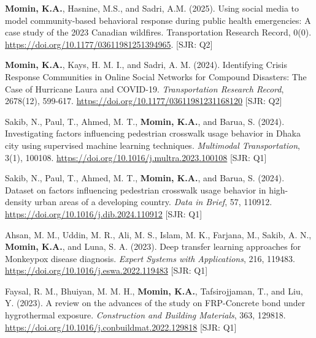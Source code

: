 \documentclass[a4paper,11pt]{article}
\begin{document}
\begin{enumerate}[leftmargin=*, labelsep=0em, align=left, widest={[\textbf{J.10}]}, itemindent=0em, label={\textbf{[J.\arabic*]}}]
\begin{justifying}
    \item \textbf{Momin, K.A.}, Hasnine, M.S., and Sadri, A.M. (2025). Using social media to model community-based behavioral response during public health emergencies: A case study of the 2023 Canadian wildfires. Transportation Research Record, 0(0). \href{https://doi.org/10.1177/03611981251394965}{https://doi.org/10.1177/03611981251394965}. \hfill [\textcolor{mycolor}{SJR: Q2}]

    \item \textbf{Momin, K.A.}, Kays, H. M. I., and Sadri, A. M. (2024). Identifying Crisis Response Communities in Online Social Networks for Compound Disasters: The Case of Hurricane Laura and COVID-19. \textit{Transportation Research Record}, 2678(12), 599-617. \href{https://doi.org/10.1177/03611981231168120}{https://doi.org/10.1177/03611981231168120}     \hfill [\textcolor{mycolor}{SJR: Q2}]
    
    \item Sakib, N., Paul, T., Ahmed, M. T., \textbf{Momin, K.A.}, and Barua, S. (2024). Investigating factors influencing pedestrian crosswalk usage behavior in Dhaka city using supervised machine learning techniques. \textit{Multimodal Transportation}, 3(1), 100108. \href{https://doi.org/10.1016/j.multra.2023.100108}{https://doi.org/10.1016/j.multra.2023.100108} \hfill [\textcolor{mycolor}{SJR: Q1}]
    
    \item Sakib, N., Paul, T., Ahmed, M. T., \textbf{Momin, K.A.}, and Barua, S. (2024). Dataset on factors influencing pedestrian crosswalk usage behavior in high-density urban areas of a developing country. \textit{Data in Brief}, 57, 110912. \href{https://doi.org/10.1016/j.dib.2024.110912}{https://doi.org/10.1016/j.dib.2024.110912} \hfill [\textcolor{mycolor}{SJR: Q1}]
    
    \item Ahsan, M. M., Uddin, M. R., Ali, M. S., Islam, M. K., Farjana, M., Sakib, A. N., \textbf{Momin, K.A.}, and Luna, S. A. (2023). Deep transfer learning approaches for Monkeypox disease diagnosis. \textit{Expert Systems with Applications}, 216, 119483. \href{https://doi.org/10.1016/j.eswa.2022.119483}{https://doi.org/10.1016/j.eswa.2022.119483} \hfill [\textcolor{mycolor}{SJR: Q1}]
    
    \item Faysal, R. M., Bhuiyan, M. M. H., \textbf{Momin, K.A.}, Tafsirojjaman, T., and Liu, Y. (2023). A review on the advances of the study on FRP-Concrete bond under hygrothermal exposure. \textit{Construction and Building Materials}, 363, 129818. \href{https://doi.org/10.1016/j.conbuildmat.2022.129818}{https://doi.org/10.1016/j.conbuildmat.2022.129818} \hfill [\textcolor{mycolor}{SJR: Q1}]
    

\end{justifying}
\end{enumerate}
\end{document}
